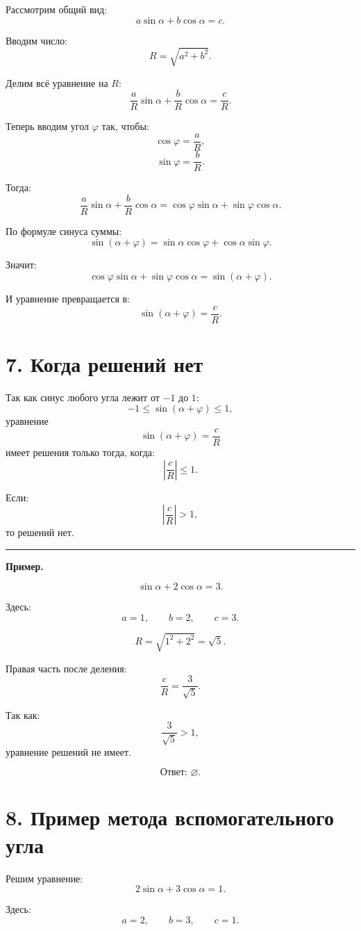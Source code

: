 \documentclass[a4paper,12pt]{article}
\newcommand{\sectionline}{%
\vspace{1mm}
\noindent\textcolor{lightline}{\rule{\linewidth}{0.8pt}}
\vspace{1mm}
}
\newcommand{\answer}[1]{\textbf{Ответ: }#1}
\begin{document}
Рассмотрим общий вид:
\[
a\sin\alpha+b\cos\alpha=c.
\]

Вводим число:
\[
R=\sqrt{a^2+b^2}.
\]

Делим всё уравнение на \(R\):
\[
\frac{a}{R}\sin\alpha+\frac{b}{R}\cos\alpha=\frac{c}{R}.
\]

Теперь вводим угол \(\varphi\) так, чтобы:
\[
\cos\varphi=\frac{a}{R},
\]
\[
\sin\varphi=\frac{b}{R}.
\]

Тогда:
\[
\frac{a}{R}\sin\alpha+\frac{b}{R}\cos\alpha
=
\cos\varphi\sin\alpha+\sin\varphi\cos\alpha.
\]

По формуле синуса суммы:
\[
\sin(\alpha+\varphi)
=
\sin\alpha\cos\varphi+\cos\alpha\sin\varphi.
\]

Значит:
\[
\cos\varphi\sin\alpha+\sin\varphi\cos\alpha
=
\sin(\alpha+\varphi).
\]

И уравнение превращается в:
\[
\sin(\alpha+\varphi)=\frac{c}{R}.
\]

\section*{7. Когда решений нет}

Так как синус любого угла лежит от \(-1\) до \(1\):
\[
-1\le\sin(\alpha+\varphi)\le1,
\]
уравнение
\[
\sin(\alpha+\varphi)=\frac{c}{R}
\]
имеет решения только тогда, когда:
\[
\left|\frac{c}{R}\right|\le1.
\]

Если:
\[
\left|\frac{c}{R}\right|>1,
\]
то решений нет.

\sectionline

\textbf{Пример.}

\[
\sin\alpha+2\cos\alpha=3.
\]

Здесь:
\[
a=1,\qquad b=2,\qquad c=3.
\]

\[
R=\sqrt{1^2+2^2}=\sqrt5.
\]

Правая часть после деления:
\[
\frac{c}{R}=\frac3{\sqrt5}.
\]

Так как:
\[
\frac3{\sqrt5}>1,
\]
уравнение решений не имеет.

\[
\answer{\displaystyle \varnothing.}
\]

\section*{8. Пример метода вспомогательного угла}

Решим уравнение:
\[
2\sin\alpha+3\cos\alpha=1.
\]

Здесь:
\[
a=2,\qquad b=3,\qquad c=1.
\]
\end{document}
